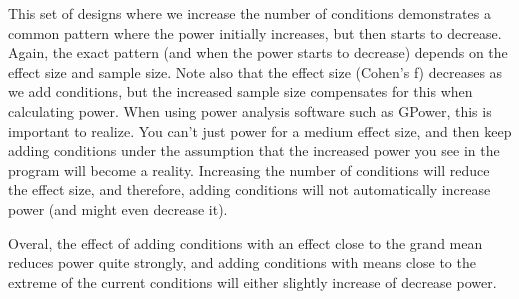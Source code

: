 \documentclass[]{article}
\begin{document}
This set of designs where we increase the number of conditions
demonstrates a common pattern where the power initially increases, but
then starts to decrease. Again, the exact pattern (and when the power
starts to decrease) depends on the effect size and sample size. Note
also that the effect size (Cohen's f) decreases as we add conditions,
but the increased sample size compensates for this when calculating
power. When using power analysis software such as GPower, this is
important to realize. You can't just power for a medium effect size, and
then keep adding conditions under the assumption that the increased
power you see in the program will become a reality. Increasing the
number of conditions will reduce the effect size, and therefore, adding
conditions will not automatically increase power (and might even
decrease it).

Overal, the effect of adding conditions with an effect close to the
grand mean reduces power quite strongly, and adding conditions with
means close to the extreme of the current conditions will either
slightly increase of decrease power.
\end{document}
